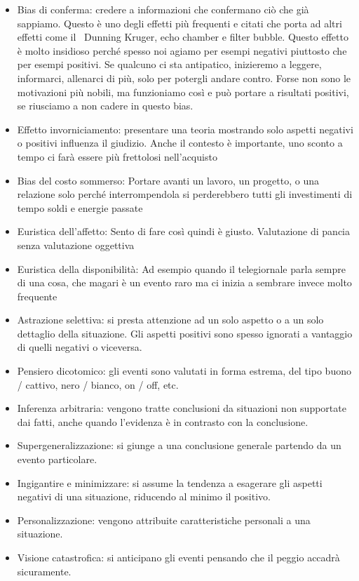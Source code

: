 \documentclass[12pt]{book} %
\begin{document}
\begin{itemize}
\item Bias di conferma: credere a informazioni che confermano ciò che già sappiamo. Questo è uno degli effetti più
frequenti e citati che porta ad altri effetti come il \ Dunning Kruger, echo chamber e filter bubble. Questo effetto è
molto insidioso perché spesso noi agiamo per esempi negativi piuttosto che per esempi positivi. Se qualcuno ci sta
antipatico, inizieremo a leggere, informarci, allenarci di più, solo per potergli andare contro. Forse non sono le
motivazioni più nobili, ma funzioniamo così e può portare a risultati positivi, se riusciamo a non cadere in questo
bias.
\item Effetto invorniciamento: presentare una teoria mostrando solo aspetti negativi o positivi influenza il giudizio.
Anche il contesto è importante, uno sconto a tempo ci farà essere più frettolosi nell'acquisto 
\item Bias del costo sommerso: Portare avanti un lavoro, un progetto, o una relazione solo perché interrompendola si
perderebbero tutti gli investimenti di tempo soldi e energie passate
\item Euristica dell'affetto: Sento di fare così quindi è giusto. Valutazione di pancia senza valutazione oggettiva 
\item Euristica della disponibilità: Ad esempio quando il telegiornale parla sempre di una cosa, che magari è un evento
raro ma ci inizia a sembrare invece molto frequente 
\item Astrazione selettiva: si presta attenzione ad un solo aspetto o a un solo dettaglio della situazione. Gli aspetti
positivi sono spesso ignorati a vantaggio di quelli negativi o viceversa.
\item Pensiero dicotomico: gli eventi sono valutati in forma estrema, del tipo buono / cattivo, nero / bianco, on / off,
etc.
\item Inferenza arbitraria: vengono tratte conclusioni da situazioni non supportate dai fatti, anche quando
l'evidenza è in contrasto con la conclusione.
\item Supergeneralizzazione: si giunge a una conclusione generale partendo da un evento particolare.
\item Ingigantire e minimizzare: si assume la tendenza a esagerare gli aspetti negativi di una situazione, riducendo al
minimo il positivo.
\item Personalizzazione: vengono attribuite caratteristiche personali a una situazione.
\item Visione catastrofica: si anticipano gli eventi pensando che il peggio accadrà sicuramente.

\end{itemize}
\end{document}
